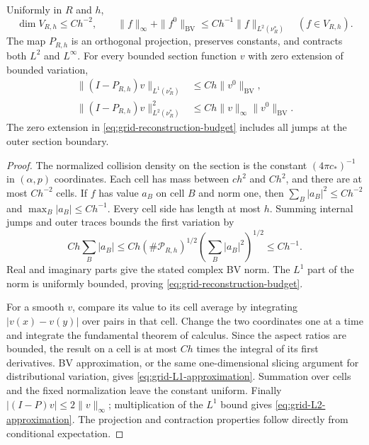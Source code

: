 \begin{lemma}
\label{lem:section-grid-reconstruction}
Uniformly in $R$ and $h$,
\begin{equation}\label{eq:grid-reconstruction-budget}
 \dim V_{R,h}\le C h^{-2},\qquad
 \|f\|_\infty+\|f^0\|_{\mathrm{BV}}
                         \le C h^{-1}\|f\|_{L^2(\nu_R^*)}
                    \quad(f\in V_{R,h}).
\end{equation}
The map $P_{R,h}$ is an orthogonal projection, preserves constants,
and contracts both $L^2$ and $L^\infty$. For every bounded section
function $v$ with zero extension of bounded variation,
\begin{align}
 \|(I-P_{R,h})v\|_{L^1(\nu_R^*)}
                 &\le Ch\|v^0\|_{\mathrm{BV}},
                       \label{eq:grid-L1-approximation}\\
 \|(I-P_{R,h})v\|_{L^2(\nu_R^*)}^2
                 &\le Ch\|v\|_\infty\|v^0\|_{\mathrm{BV}}.
                       \label{eq:grid-L2-approximation}
\end{align}
The zero extension in \eqref{eq:grid-reconstruction-budget} includes
all jumps at the outer section boundary.
\end{lemma}
\begin{proof}
The normalized collision density on the section is the constant
$(4\pi c_*)^{-1}$ in $(\alpha,p)$ coordinates. Each cell has mass
between $c h^2$ and $C h^2$, and there are at most $C h^{-2}$ cells.
If $f$ has value $a_B$ on cell $B$ and norm one, then
$\sum_B|a_B|^2\le C h^{-2}$ and $\max_B|a_B|\le C h^{-1}$.
Every cell side has length at most $h$. Summing internal jumps and
outer traces bounds the first variation by
\[
 C h\sum_B|a_B|
 \le C h(\#\mathcal P_{R,h})^{1/2}
                       \left(\sum_B|a_B|^2\right)^{1/2}
 \le C h^{-1}.
\]
Real and imaginary parts give the stated complex BV norm. The $L^1$
part of the norm is uniformly bounded, proving
\eqref{eq:grid-reconstruction-budget}.

For a smooth $v$, compare its value to its cell average by integrating
$|v(x)-v(y)|$ over pairs in that cell. Change the two coordinates one
at a time and integrate the fundamental theorem of calculus. Since
the aspect ratios are bounded, the result on a cell is at most $Ch$
times the integral of its first derivatives. BV approximation, or
the same one-dimensional slicing argument for distributional
variation, gives \eqref{eq:grid-L1-approximation}. Summation over
cells and the fixed normalization leave the constant uniform.
Finally $|(I-P)v|\le2\|v\|_\infty$; multiplication of the $L^1$
bound gives \eqref{eq:grid-L2-approximation}. The projection and
contraction properties follow directly from conditional expectation.
\end{proof}

